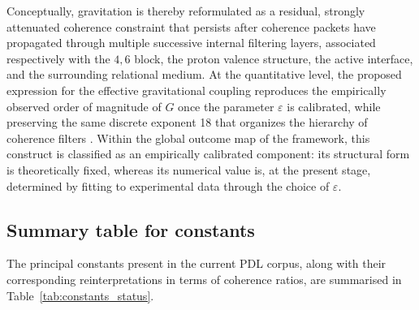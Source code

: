 \documentclass[11pt,a4paper]{article}
\begin{document}
Conceptually, gravitation is thereby reformulated as a residual, strongly attenuated coherence constraint that persists after coherence packets have propagated through multiple successive internal filtering layers, associated respectively with the \(4,6\) block, the proton valence structure, the active interface, and the surrounding relational medium. At the quantitative level, the proposed expression for the effective gravitational coupling reproduces the empirically observed order of magnitude of \(G\) once the parameter \(\varepsilon\) is calibrated, while preserving the same discrete exponent 18 that organizes the hierarchy of coherence filters
\citep{Exponent_18_PDL_2026,Coherence_Leakage_18_2026}. Within the global outcome map of the framework, this construct is classified as an empirically calibrated component: its structural form is theoretically fixed, whereas its numerical value is, at the present stage, determined by fitting to experimental data through the choice of \(\varepsilon\).

\subsection{Summary table for constants}
\label{subsec:constants_table}

The principal constants present in the current PDL corpus, along with their corresponding reinterpretations in terms of coherence ratios, are summarised in Table~\ref{tab:constants_status}.

\setlength{\LTpre}{18pt}
\setlength{\LTpost}{0pt}
\end{document}
